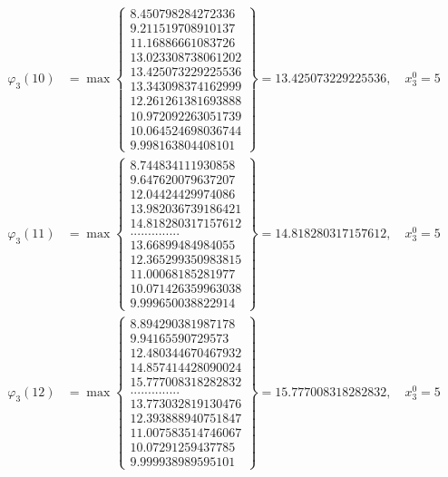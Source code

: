 \documentclass{article}
\begin{document}
\begin{align*}
  
  
  
\varphi_{3}(10) &= \max \left\{ \begin{array}{c}
8.450798284272336 \\
 9.211519708910137 \\
 11.16886661083726 \\
 13.023308738061202 \\
 13.425073229225536 \\
 13.343098374162999 \\
 12.261261381693888 \\
 10.972092263051739 \\
 10.064524698036744 \\
 9.998163804408101
\end{array} \right\} = 13.425073229225536, \quad x_{3}^0 = 5\\
  
  
  
  
\varphi_{3}(11) &= \max \left\{ \begin{array}{c}
8.744834111930858 \\
 9.647620079637207 \\
 12.04424429974086 \\
 13.982036739186421 \\
 14.818280317157612 \\
 .............. \\
 13.66899484984055 \\
 12.365299350983815 \\
 11.00068185281977 \\
 10.071426359963038 \\
 9.999650038822914
\end{array} \right\} = 14.818280317157612, \quad x_{3}^0 = 5\\
  
  
  
  
\varphi_{3}(12) &= \max \left\{ \begin{array}{c}
8.894290381987178 \\
 9.94165590729573 \\
 12.480344670467932 \\
 14.857414428090024 \\
 15.777008318282832 \\
 .............. \\
 13.773032819130476 \\
 12.393888940751847 \\
 11.007583514746067 \\
 10.07291259437785 \\
 9.999938989595101
\end{array} \right\} = 15.777008318282832, \quad x_{3}^0 = 5\\
  

\end{align*}
\end{document}
